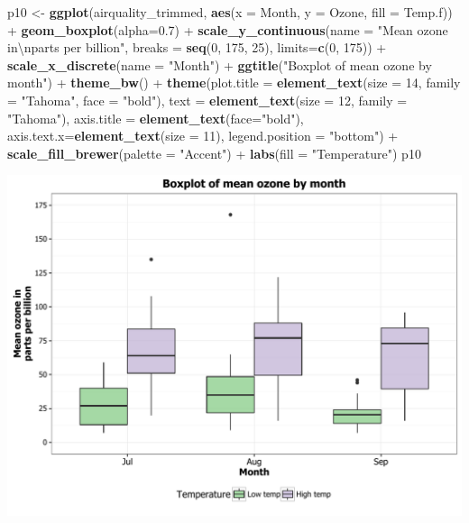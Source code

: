 \documentclass[]{article}
\newenvironment{Shaded}{\begin{snugshade}}{\end{snugshade}}
\newcommand{\KeywordTok}[1]{\textcolor[rgb]{0.13,0.29,0.53}{\textbf{{#1}}}}
\newcommand{\DataTypeTok}[1]{\textcolor[rgb]{0.13,0.29,0.53}{{#1}}}
\newcommand{\DecValTok}[1]{\textcolor[rgb]{0.00,0.00,0.81}{{#1}}}
\newcommand{\FloatTok}[1]{\textcolor[rgb]{0.00,0.00,0.81}{{#1}}}
\newcommand{\CharTok}[1]{\textcolor[rgb]{0.31,0.60,0.02}{{#1}}}
\newcommand{\StringTok}[1]{\textcolor[rgb]{0.31,0.60,0.02}{{#1}}}
\newcommand{\NormalTok}[1]{{#1}}
\begin{document}
\begin{Shaded}
\begin{Highlighting}[]
\NormalTok{p10 <-}\StringTok{ }\KeywordTok{ggplot}\NormalTok{(airquality_trimmed, }\KeywordTok{aes}\NormalTok{(}\DataTypeTok{x =} \NormalTok{Month, }\DataTypeTok{y =} \NormalTok{Ozone, }\DataTypeTok{fill =} \NormalTok{Temp.f)) +}\StringTok{ }
\StringTok{        }\KeywordTok{geom_boxplot}\NormalTok{(}\DataTypeTok{alpha=}\FloatTok{0.7}\NormalTok{) +}
\StringTok{        }\KeywordTok{scale_y_continuous}\NormalTok{(}\DataTypeTok{name =} \StringTok{"Mean ozone in}\CharTok{\textbackslash{}n}\StringTok{parts per billion"}\NormalTok{,}
                           \DataTypeTok{breaks =} \KeywordTok{seq}\NormalTok{(}\DecValTok{0}\NormalTok{, }\DecValTok{175}\NormalTok{, }\DecValTok{25}\NormalTok{),}
                           \DataTypeTok{limits=}\KeywordTok{c}\NormalTok{(}\DecValTok{0}\NormalTok{, }\DecValTok{175}\NormalTok{)) +}
\StringTok{        }\KeywordTok{scale_x_discrete}\NormalTok{(}\DataTypeTok{name =} \StringTok{"Month"}\NormalTok{) +}
\StringTok{        }\KeywordTok{ggtitle}\NormalTok{(}\StringTok{"Boxplot of mean ozone by month"}\NormalTok{) +}
\StringTok{        }\KeywordTok{theme_bw}\NormalTok{() +}
\StringTok{        }\KeywordTok{theme}\NormalTok{(}\DataTypeTok{plot.title =} \KeywordTok{element_text}\NormalTok{(}\DataTypeTok{size =} \DecValTok{14}\NormalTok{, }\DataTypeTok{family =} \StringTok{"Tahoma"}\NormalTok{, }\DataTypeTok{face =} \StringTok{"bold"}\NormalTok{), }
              \DataTypeTok{text =} \KeywordTok{element_text}\NormalTok{(}\DataTypeTok{size =} \DecValTok{12}\NormalTok{, }\DataTypeTok{family =} \StringTok{"Tahoma"}\NormalTok{),}
              \DataTypeTok{axis.title =} \KeywordTok{element_text}\NormalTok{(}\DataTypeTok{face=}\StringTok{"bold"}\NormalTok{),}
              \DataTypeTok{axis.text.x=}\KeywordTok{element_text}\NormalTok{(}\DataTypeTok{size =} \DecValTok{11}\NormalTok{),}
              \DataTypeTok{legend.position =} \StringTok{"bottom"}\NormalTok{) +}
\StringTok{        }\KeywordTok{scale_fill_brewer}\NormalTok{(}\DataTypeTok{palette =} \StringTok{"Accent"}\NormalTok{) +}
\StringTok{        }\KeywordTok{labs}\NormalTok{(}\DataTypeTok{fill =} \StringTok{"Temperature"}\NormalTok{)}
\NormalTok{p10}
\end{Highlighting}
\end{Shaded}

\begin{center}\includegraphics{0_all_posts_pdf/box_18-1} \end{center}
\end{document}
